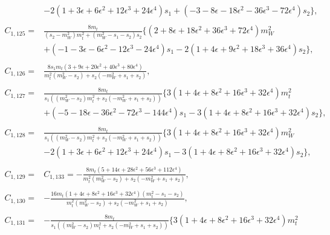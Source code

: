 \documentclass[twocolumn,aps,showpacs,nofootinbib,superscriptaddress,prd]{revtex4-2}
\begin{document}
\begin{widetext}
\begin{align}
\nonumber\\&
-2\left(1 +3 \epsilon +6 \epsilon^2 +12 \epsilon^3 +24 \epsilon^4\right)s_1+\left(-3 -8 \epsilon -18 \epsilon^2 -36 \epsilon^3 -72 \epsilon^4\right)s_2\}
,\nonumber\\
\nonumber\\
C_{1,125}=&\frac{8m_t}{\left(s_2-m_W^2\right)m_t^2+\left(m_W^2-s_1-s_2\right)s_2}\{\left(2 +8 \epsilon +18 \epsilon^2 +36 \epsilon^3 +72 \epsilon^4\right)m_W^2
\nonumber\\&
+\left(-1 -3 \epsilon -6 \epsilon^2 -12 \epsilon^3 -24 \epsilon^4\right)s_1-2\left(1 +4 \epsilon +9 \epsilon^2 +18 \epsilon^3 +36 \epsilon^4\right)s_2\}
,\nonumber\\
\nonumber\\
C_{1,126}=&\frac{8s_1m_t\left(3 +9 \epsilon +20 \epsilon^2 +40 \epsilon^3 +80 \epsilon^4\right)}{m_t^2\left(m_W^2-s_2\right)+s_2
\left(-m_W^2+s_1+s_2\right)}
,\nonumber\\
\nonumber\\
C_{1,127}=&\frac{8m_t}{s_1\left(\left(m_W^2-s_2\right)m_t^2+s_2\left(-m_W^2+s_1+s_2\right)\right)}\{3\left(1 +4 \epsilon +8 \epsilon^2 +16 \epsilon^3 +32 \epsilon^4\right)m_t^2
\nonumber\\&
+\left(-5 -18 \epsilon -36 \epsilon^2 -72 \epsilon^3 -144 \epsilon^4\right)s_1-3\left(1 +4 \epsilon +8 \epsilon^2 +16 \epsilon^3 +32 \epsilon^4\right)s_2\}
,\nonumber\\
\nonumber\\
C_{1,128}=&\frac{8m_t}{s_1\left(\left(m_W^2-s_2\right)m_t^2+s_2\left(-m_W^2+s_1+s_2\right)\right)}\{3\left(1 +4 \epsilon +8 \epsilon^2 +16 \epsilon^3 +32 \epsilon^4\right)m_W^2
\nonumber\\&
-2\left(1 +3 \epsilon +6 \epsilon^2 +12 \epsilon^3 +24 \epsilon^4\right)s_1-3\left(1 +4 \epsilon +8 \epsilon^2 +16 \epsilon^3 +32 \epsilon^4\right)s_2\}
,\nonumber\\
\nonumber\\
C_{1,129}=&C_{1,133}=-\frac{8m_t\left(5 +14 \epsilon +28 \epsilon^2 +56 \epsilon^3 +112 \epsilon^4\right)}{m_t^2\left(m_W^2-s_2\right)+s_2
\left(-m_W^2+s_1+s_2\right)}
,\nonumber\\
\nonumber\\
C_{1,130}=&-\frac{16m_t\left(1 +4 \epsilon +8 \epsilon^2 +16 \epsilon^3 +32 \epsilon^4\right)\left(m_t^2-s_1-s_2\right)}{m_t^2
\left(m_W^2-s_2\right)+s_2\left(-m_W^2+s_1+s_2\right)}
,\nonumber\\
\nonumber\\
C_{1,131}=&-\frac{8m_t}{s_1\left(\left(m_W^2-s_2\right)m_t^2+s_2\left(-m_W^2+s_1+s_2\right)\right)}\{3\left(1 +4 \epsilon +8 \epsilon^2 +16 \epsilon^3 +32 \epsilon^4\right)m_t^2

\end{align}
\end{widetext}
\end{document}
